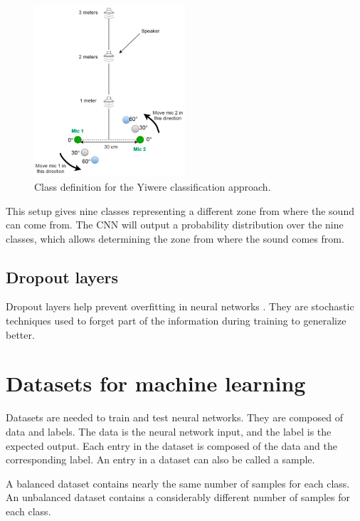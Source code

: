 \begin{figure}[H]
    \centering
    \includegraphics[width=0.5\textwidth]{../Images/Yiwere_classes.png}
    \caption{Class definition for the Yiwere classification approach\cite{s20010172}.}
    \label{fig:Yiwere_classes}
\end{figure}

This setup gives nine classes representing a different zone from where the sound can come from. The CNN will output a probability distribution over the nine classes, which allows determining the zone from where the sound comes from.

\subsection{Dropout layers}

Dropout layers help prevent overfitting in neural networks \cite{hinton2012improving}. They are stochastic techniques used to forget part of the information during training to generalize better.

\section{Datasets for machine learning}

Datasets are needed to train and test neural networks. They are composed of data and labels. The data is the neural network input, and the label is the expected output. Each entry in the dataset is composed of the data and the corresponding label. An entry in a dataset can also be called a sample. 

A balanced dataset contains nearly the same number of samples for each class. An unbalanced dataset contains a considerably different number of samples for each class.

